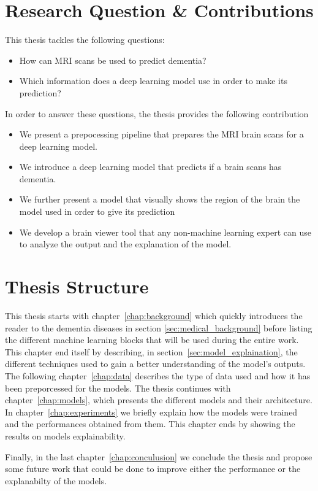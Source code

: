\section{Research Question & Contributions}
This thesis tackles the following questions:
\begin{itemize}
    \item How can MRI scans be used to predict dementia?
    \item Which information does a deep learning model use in order to make its prediction? 
\end{itemize}

In order to answer these questions, the thesis provides the following contribution
\begin{itemize}
    \item We present a prepocessing pipeline that prepares the MRI brain scans for a deep learning model.
    \item We introduce a deep learning model that predicts if a brain scans has dementia.
    \item We further present a model that visually shows the region of the brain the model used in order to give its prediction
    \item We develop a brain viewer tool that any non-machine learning expert can use to analyze the output and the explanation of the model.  
\end{itemize}



\section{Thesis Structure}
\label{sec:structure}
This thesis starts with chapter~\ref{chap:background} which quickly introduces the reader to the dementia diseases in section \ref{sec:medical_background} before listing the different machine learning blocks that will be used during the entire work. This chapter end itself by describing, in section~\ref{sec:model_explaination}, the different techniques used to gain a better understanding of the model's outputs. The following chapter~\ref{chap:data} describes the type of data used and how it has been preporcessed for the models. The thesis continues with chapter~\ref{chap:models}, which presents the different models and their architecture. 
In chapter~\ref{chap:experiments} we briefly explain how the models were trained and the performances obtained from them. This chapter ends by showing the results on models explainability.

Finally, in the last chapter~\ref{chap:conculusion} we conclude the thesis and propose some future work that could be done to improve either the performance or the explanabilty of the models.
